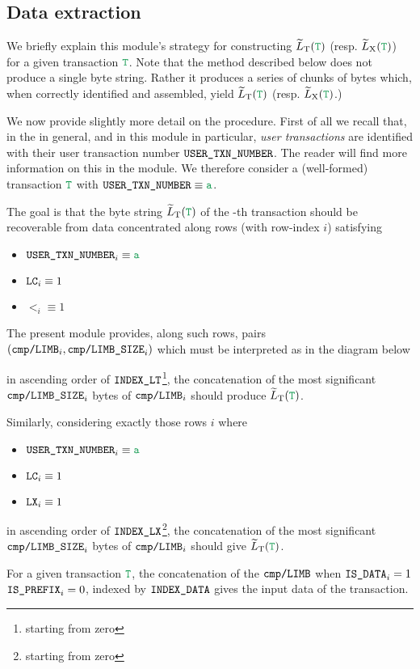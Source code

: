 \subsection{Data extraction}

We briefly explain this module's strategy for constructing $\locLtTildeOfT$ (resp. $\locLxTildeOfT$) for a given transaction $\locTransaction$.
Note that the method described below does not produce a single byte string.
Rather it produces a series of chunks of bytes which, when correctly identified and assembled, yield $\locLtTildeOfT$ (resp. $\locLxTildeOfT$.)

We now provide slightly more detail on the procedure.
First of all we recall that, in the \zkEvm{} in general, and in this module in particular,
\emph{user transactions} are identified with their user transaction number
$\texttt{USER}\texttt{\_}\texttt{TXN\_NUMBER}$.
The reader will find more information on this in the \userTxnDataMod{} module.
We therefore consider a (well-formed) transaction $\locTransaction$ with $\userTransactionNumber \equiv \loc{a}$.

The goal is that the byte string $\locLtTildeOfT$
of the -th transaction
should be recoverable from data concentrated along rows
(with row-index $i$) satisfying
\begin{multicols}{3}
	\begin{itemize}
		\item $\userTransactionNumber _{i} \equiv \loc{a}$
		\item $\texttt{LC}                    _{i} \equiv 1$
		\item $\lt                    _{i} \equiv 1$
	\end{itemize}
\end{multicols}
The present module provides, along such rows,
pairs
$(\texttt{cmp}\texttt{/}\texttt{{\texttt{LIMB}}} _{i},
\texttt{cmp}\texttt{/}\texttt{{LIMB\_SIZE}} _{i})$
which must be interpreted as in the diagram below



in ascending order of $\texttt{INDEX\_LT}$\footnote{starting from zero},
the concatenation of the most significant 
$\texttt{cmp}\texttt{/}\texttt{{LIMB\_SIZE}} _{i}$ bytes of $\texttt{cmp}\texttt{/}\texttt{{\texttt{LIMB}}} _{i}$ should produce $\locLtTildeOfT$.

Similarly, considering exactly those rows $i$ where
\begin{multicols}{3}
	\begin{itemize}
		\item $\userTransactionNumber _{i} \equiv \loc{a}$
		\item $\texttt{LC}                    _{i} \equiv 1$
		\item $\texttt{LX}                    _{i} \equiv 1$
	\end{itemize}
\end{multicols}
\noindent in ascending order of $\texttt{INDEX\_LX}$\footnote{starting from zero},
the concatenation of the most significant 
$\texttt{cmp}\texttt{/}\texttt{{LIMB\_SIZE}} _{i}$ bytes of $\texttt{cmp}\texttt{/}\texttt{{\texttt{LIMB}}} _{i}$ should give $\locLtTildeOfT$.

\saNote{} For a given transaction $\locTransaction$,
the concatenation of the
$\texttt{cmp}\texttt{/}\texttt{{\texttt{LIMB}}}$ when
$\texttt{IS\_DATA} _{i} = 1$ \et{}
$\texttt{\texttt{IS\_PREFIX}} _{i} = 0$, indexed by
$\texttt{INDEX\_DATA}$ gives the input data of the transaction.
